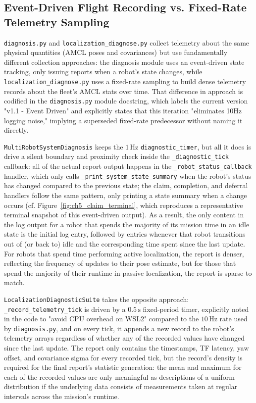 \subsection{Event-Driven Flight Recording vs. Fixed-Rate Telemetry Sampling}

\texttt{diagnosis.\allowbreak py} and \texttt{localization\_\allowbreak diagnose.py} collect telemetry about the same physical quantities (\allowbreak AMCL poses and covariances) but use fundamentally different collection approaches: the diagnosis module uses an event-driven state tracking, only issuing reports when a robot's state changes, while \texttt{localization\_\allowbreak diagnose.py} uses a fixed-rate sampling to build dense telemetry records about the fleet's AMCL stats over time. That difference in approach is codified in the \texttt{diagnosis.py} module docstring, which labels the current version "v1.1 - Event Driven" and explicitly states that this iteration "eliminates 10Hz logging noise," implying a superseded fixed-rate predecessor without naming it directly.

\texttt{MultiRobotSystemDiagnosis} keeps the $1\,\text{Hz}$ \texttt{diagnostic\_timer}, but all it does is drive a silent boundary and proximity check inside the \texttt{\_diagnostic\_tick} callback: all of the actual report output happens in the \texttt{\_robot\_status\_callback} handler, which only calls \texttt{\_print\_system\_state\_summary} when the robot's status has changed compared to the previous state; the claim, completion, and deferral handlers follow the same pattern, only printing a state summary when a change occurs (cf. Figure~\ref{fig:ch5_claim_terminal}, which reproduces a representative terminal snapshot of this event-driven output). As a result, the only content in the log output for a robot that spends the majority of its mission time in an idle state is the initial log entry, followed by entries whenever that robot transitions out of (or back to) idle and the corresponding time spent since the last update. For robots that spend time performing active localization, the report is denser, reflecting the frequency of updates to their pose estimate, but for those that spend the majority of their runtime in passive localization, the report is sparse to match.

\texttt{LocalizationDiagnosticSuite} takes the opposite approach: \texttt{\_record\_telemetry\_tick} is driven by a $0.5\,\text{s}$ fixed-period timer, explicitly noted in the code to "avoid CPU overhead on WSL2" compared to the $10\,\text{Hz}$ rate used by \texttt{diagnosis.py}, and on every tick, it appends a new record to the robot's telemetry arrays regardless of whether any of the recorded values have changed since the last update. The report only contains the timestamps, TF latency, yaw offset, and covariance sigma for every recorded tick, but the record's density is required for the final report's statistic generation: the mean and maximum for each of the recorded values are only meaningful as descriptions of a uniform distribution if the underlying data consists of measurements taken at regular intervals across the mission's runtime.

